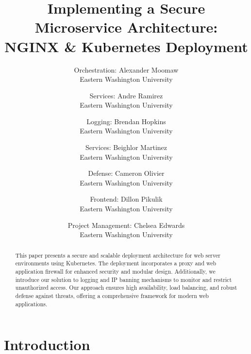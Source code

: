 \documentclass[letterpaper,twocolumn,10pt]{article}
\begin{document}

\date{}

\title{\Large \bf Implementing a Secure Microservice Architecture:\\
  NGINX \& Kubernetes Deployment}

\author{
{\rm Orchestration: Alexander Moomaw}\\
Eastern Washington University
\and
{\rm Services: Andre Ramirez}\\
Eastern Washington University
\and
{\rm Logging: Brendan Hopkins}\\
Eastern Washington University
\and
{\rm Services: Beighlor Martinez}\\
Eastern Washington University
\and
{\rm Defense: Cameron Olivier}\\
Eastern Washington University
\and
{\rm Frontend: Dillon Pikulik}\\
Eastern Washington University
\and
{\rm Project Management: Chelsea Edwards}\\
Eastern Washington University
}

\maketitle
\begin{abstract}
This paper presents a secure and scalable deployment architecture for web server environments using Kubernetes. 
The deployment incorporates a proxy and web application firewall for enhanced security and modular design. 
Additionally, we introduce our solution to logging and IP banning mechanisms to monitor and restrict unauthorized access. 
Our approach ensures high availability, load balancing, and robust defense against threats, offering a comprehensive framework for modern web applications.
\end{abstract}

\section{Introduction}

\end{document}
